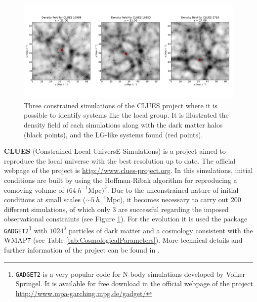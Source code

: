 \begin{figure}[htbp]
	\centering
	\includegraphics[width=1.0\textwidth]
	{./figures/3_nbody_simulations/CLUES_Simulations.pdf}

	\caption{\small{Three constrained simulations of the CLUES project 
	where it is possible to identify systems like the local group. It is
	illustrated the density field of each simulations along with the dark
	matter halos (black points), and the LG-like systems found (red 
	points).}}
	
	\label{fig:CLUES_Right}
\end{figure}


\textbf{CLUES} (Constrained Local UniversE Simulations) is a project aimed
to reproduce the local universe with the best resolution up to date. The 
official webpage of the project is \url{http://www.clues-project.org}. In 
this simulations, initial conditions are built by using the Hoffman-Ribak
algorithm \cite{Hoffman1991} for reproducing a comoving volume of $(64\ 
h^{-1}$Mpc$)^{3}$. Due to the unconstrained nature of initial conditions at
small scales ($\sim 5\ h^{-1}$Mpc), it becomes necessary to carry out $200$
different simulations, of which only $3$ are successful regarding the 
imposed observational constraints (see Figure \ref{fig:CLUES_Right}).
For the evolution it is used the package \texttt{GADGET2}\footnote{
\texttt{GADGET2} is a very popular code for N-body simulations developed
by Volker Springel. It is available for free download in the official 
webpage of the project \url{http://www.mpa-garching.mpg.de/gadget/}}
with $1024^3$ particles of dark matter and a cosmology consistent with
the WMAP7 (see Table \ref{tab:CosmologicalParameters}). More technical 
details  and further information of the project can be found in
\cite{Gottloeber2010}.


